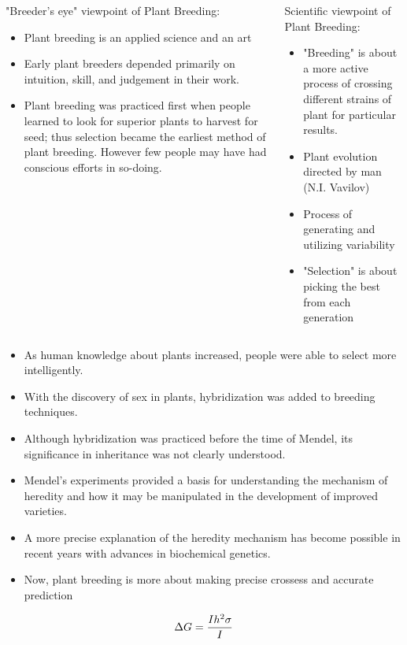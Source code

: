 \documentclass[11pt,ignorenonframetext,aspectratio=169]{beamer}
\begin{document}
\begin{frame}{}
\protect\hypertarget{section-3}{}
\begin{columns}[T,onlytextwidth]
\begin{column}{0.5\textwidth}
"Breeder's eye" viewpoint of Plant Breeding: 
\begin{itemize}
\item Plant breeding is an applied science and an art 
\item Early plant breeders depended primarily on intuition, skill, and judgement in their work.
\item Plant breeding was practiced first when people learned to look for superior plants to harvest for seed; thus selection became the earliest method of plant breeding. However few people may have had conscious efforts in so-doing.
\end{itemize}
\end{column}
\begin{column}{0.5\textwidth}  %
Scientific viewpoint of Plant Breeding: 
\begin{itemize}
\item "Breeding" is about a more active process of crossing different strains of plant for particular results.
\item Plant evolution directed by man (N.I. Vavilov)
\item Process of generating and utilizing variability
\item "Selection" is about picking the best from each generation
\end{itemize}
\end{column}
\end{columns}
\end{frame}

\begin{frame}{}
\protect\hypertarget{section-4}{}
\begin{itemize}
\item
  As human knowledge about plants increased, people were able to select
  more intelligently.
\item
  With the discovery of sex in plants, hybridization was added to
  breeding techniques.
\item
  Although hybridization was practiced before the time of Mendel, its
  significance in inheritance was not clearly understood.
\item
  Mendel's experiments provided a basis for understanding the mechanism
  of heredity and how it may be manipulated in the development of
  improved varieties.
\item
  A more precise explanation of the heredity mechanism has become
  possible in recent years with advances in biochemical genetics.
\item
  Now, plant breeding is more about making precise crossess and accurate
  prediction
\end{itemize}

\[\Large \Delta{G}=\frac{Ih^2 \sigma}{I}\]
\end{frame}
\end{document}
